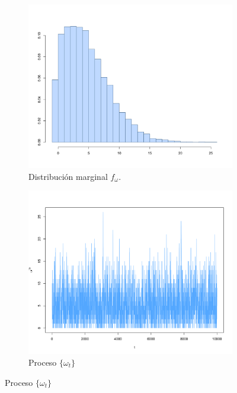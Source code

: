 \documentclass[11pt,a4paper]{article}
\begin{document}
\begin{figure}
    \centering
    \begin{subfigure}[t]{0.45\textwidth}
        \centering
        \includegraphics[width=\linewidth]{hier_hist_omega.png} 
        \caption{Distribución marginal $f_\omega$.} \label{fig:hier_hist_omega}
    \end{subfigure}
    \hfill
    \begin{subfigure}[t]{0.45\textwidth}
        \centering
        \includegraphics[width=\linewidth]{hier_chain_omega.png} 
        \caption{Proceso $\lbrace \omega_t \rbrace$} \label{fig:hier_chain_omega}
    \end{subfigure}


\end{figure}
\end{document}

